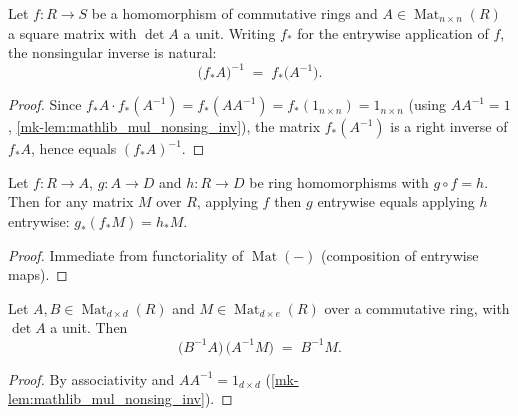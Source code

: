 \begin{lemma}\label{mk-lem:gr_map_nonsing_inv}
  \leanok

  Let \(f : R \to S\) be a homomorphism of commutative rings and
  \(A \in \operatorname{Mat}_{n\times n}(R)\) a square matrix with \(\det A\) a
  unit. Writing \(f_\ast\) for the entrywise application of \(f\), the
  nonsingular inverse is natural:
  \[
    \bigl(f_\ast A\bigr)^{-1} \;=\; f_\ast\bigl(A^{-1}\bigr).
  \]
\end{lemma}
\begin{proof}
  \leanok

Since \(f_\ast A \cdot f_\ast(A^{-1}) = f_\ast(A A^{-1}) = f_\ast(1_{n\times n})
  = 1_{n\times n}\) (using \(A A^{-1} = 1\), \ref{mk-lem:mathlib_mul_nonsing_inv}),
  the matrix \(f_\ast(A^{-1})\) is a right inverse of \(f_\ast A\), hence equals
  \((f_\ast A)^{-1}\).
\end{proof}

\begin{lemma}\label{mk-lem:gr_map_map_eq_of_comp}
  \leanok

  Let \(f : R \to A\), \(g : A \to D\) and \(h : R \to D\) be ring
  homomorphisms with \(g \circ f = h\). Then for any matrix \(M\) over \(R\),
  applying \(f\) then \(g\) entrywise equals applying \(h\) entrywise:
  \(g_\ast(f_\ast M) = h_\ast M\).
\end{lemma}
\begin{proof}
  \leanok

Immediate from functoriality of \(\operatorname{Mat}(-)\) (composition of
  entrywise maps).
\end{proof}

\begin{lemma}\label{mk-lem:gr_inv_mul_inv_mul_cancel}
  \leanok

  Let \(A, B \in \operatorname{Mat}_{d\times d}(R)\) and
  \(M \in \operatorname{Mat}_{d\times e}(R)\) over a commutative ring, with
  \(\det A\) a unit. Then
  \[
    \bigl(B^{-1} A\bigr)\,\bigl(A^{-1} M\bigr) \;=\; B^{-1} M.
  \]
\end{lemma}
\begin{proof}
  \leanok

By associativity and \(A A^{-1} = 1_{d\times d}\)
  (\ref{mk-lem:mathlib_mul_nonsing_inv}).
\end{proof}

